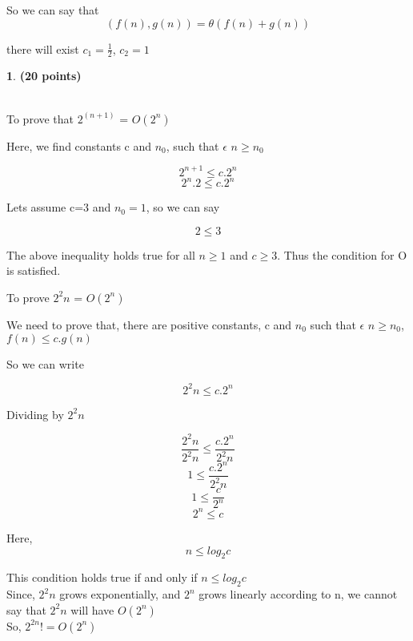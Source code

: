 \documentclass[11pt]{article}
\theoremstyle{definition}
\newtheorem{prob}{}
\newcommand{\solution}{\medskip\noindent{\color{DarkBlue}\textbf{Solution:}}}
\begin{document}
So we can say that \\

\[ (f(n),g(n)) = \theta(f(n) + g(n)) \] 

there will exist $c_1 = \frac{1}{2}$, $c_2 = 1$
\begin{prob} \textbf{(20 points)}
\end{prob}
\solution \\

To prove that $2^{(n+1)}$ = $O{(2^n)}$

Here, we find constants c and $n_0$, such that $\epsilon$ $n \geq n_0$


\[2^{n+1} \leq c.2^n \]
\[2^n . 2 \leq c.2^n \]

Lets assume c=3 and $n_0 =1$, so we can say

\[ 2 \leq 3\]

The above inequality holds true for all $n\geq 1$ and $c \geq 3$. Thus the condition for O is satisfied.

To prove $2^2n$ = $O(2^n)$

We need to prove that, there are positive constants, c and $n_0$ such that $\epsilon$ $n \geq n_0$, $f(n) \leq c.g(n)$

So we can write

\[ 2^2n \leq c.2^n \]

Dividing by $2^2n$

\[ \frac{2^2n}{2^2n} \leq \frac{c.2^n}{2^2n} \]
\[ 1 \leq \frac{c.2^n}{2^2n} \]
\[ 1 \leq \frac{c}{2^n} \]
\[ 2^n \leq c \]

Here, \[ n \leq log_2 c \]

This condition holds true if and only if $n \leq log_2 c$ \\

Since, $2^2n$ grows exponentially, and $2^n$ grows linearly according to n, we cannot say that $2^2n$ will have $O(2^n)$ \\

So, $2^{2n} != O(2^n)$
\end{document}
